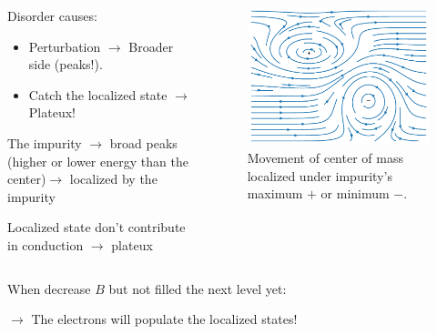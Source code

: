 \documentclass{beamer}
\begin{document}
\begin{frame}
	\begin{columns}
		\begin{column}{0.6\linewidth}
			Disorder causes:\null
			\begin{itemize}
				\item Perturbation \(\to\) Broader side (peaks!).\\
				\item Catch the localized state \(\to\) Plateux!
			\end{itemize}
			\vspace{0.2cm}
The impurity \(\to\) broad peaks (higher or lower energy than the center)\(\to\) localized by the impurity\vspace{0.1cm}
			\begin{center}
Localized state don't contribute in conduction \(\to\) plateux
			\end{center}
		\end{column}
		\begin{column}{0.4\linewidth}
\begin{figure}
\includegraphics[width = \linewidth]{images/Disorder.pdf}
\caption{Movement of center of mass localized under impurity's maximum \(+\) or minimum \(-\).}
\end{figure}
		\end{column}
	\end{columns}
\vspace{0.2cm}
When decrease \(B\) but not filled the next level yet:
	\begin{center}
	\(\to\) The electrons will populate the localized states!
	\end{center}
\end{frame}
\end{document}
